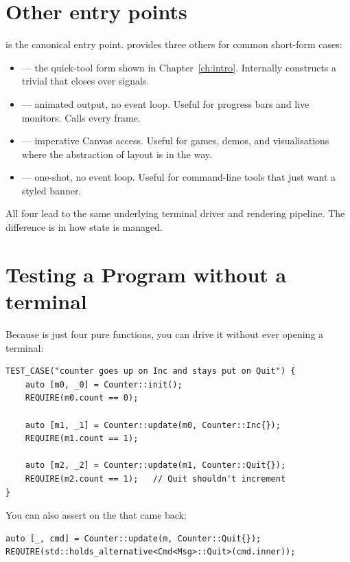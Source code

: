 \section{Other entry points}

 is the canonical entry point. \maya{} provides three
others for common short-form cases:

\begin{itemize}[leftmargin=*]
  \item {} --- the quick-tool form
    shown in Chapter~\ref{ch:intro}. Internally constructs a
    trivial  that closes over signals.
  \item {} --- animated output, no event loop.
    Useful for progress bars and live monitors. Calls
     every frame.
  \item {} --- imperative
    Canvas access. Useful for games, demos, and visualisations
    where the abstraction of layout is in the way.
  \item {} --- one-shot, no event loop. Useful
    for command-line tools that just want a styled banner.
\end{itemize}

All four lead to the same underlying terminal driver and rendering
pipeline. The difference is in how state is managed.

\section{Testing a Program without a terminal}

Because  is just four pure functions, you can drive
it without ever opening a terminal:

\begin{lstlisting}
TEST_CASE("counter goes up on Inc and stays put on Quit") {
    auto [m0, _0] = Counter::init();
    REQUIRE(m0.count == 0);

    auto [m1, _1] = Counter::update(m0, Counter::Inc{});
    REQUIRE(m1.count == 1);

    auto [m2, _2] = Counter::update(m1, Counter::Quit{});
    REQUIRE(m2.count == 1);   // Quit shouldn't increment
}
\end{lstlisting}

You can also assert on the  that came back:

\begin{lstlisting}
auto [_, cmd] = Counter::update(m, Counter::Quit{});
REQUIRE(std::holds_alternative<Cmd<Msg>::Quit>(cmd.inner));
\end{lstlisting}

